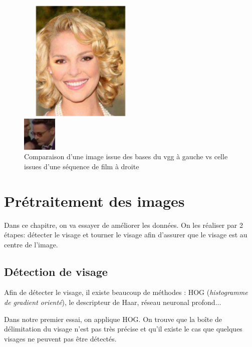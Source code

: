 \documentclass[12pt,french]{report}
\begin{document}
\begin{figure}[H]
	\begin{minipage}[b]{.47\linewidth}
		\begin{center}%
			\includegraphics[width= 224px,height=224px]{image_rapport/v4.png}
		\end{center}%
	\end{minipage}
	\hfill
	\begin{minipage}[b]{.47\linewidth}
		\begin{center}%
			\includegraphics{image_rapport/v3.png}
		\end{center}%
	\end{minipage}
	\caption{Comparaison d'une image issue des bases du vgg à gauche vs celle issues d'une séquence de film à droite}\label{"com"}%
\end{figure}

\chapter{Prétraitement des images}
Dans ce chapitre, on va essayer de améliorer les données. On les réaliser par 2 étapes: détecter le visage et tourner le visage afin d'assurer que le visage est au centre de l'image.

\section{Détection de visage}
Afin de détecter le visage, il existe beaucoup de méthodes : HOG (\emph{histogramme de gradient orienté}), le descripteur de Haar, réseau neuronal profond...

Dans notre premier essai, on applique HOG. On trouve que la boîte de délimitation du visage n'est pas très précise et qu'il existe le cas que quelques visages ne peuvent pas être détectés.
\end{document}
